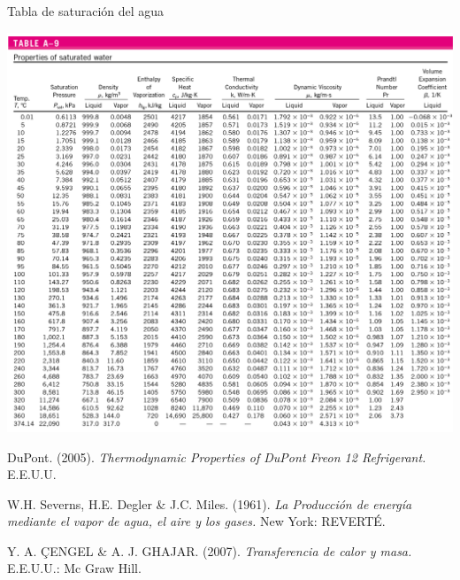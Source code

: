 \documentclass[11pt,letterpaper]{extarticle}        %
\numberwithin{equation}{section}                    %
\begin{document}
\begin{table}[H]
\centering
\caption[Tabla de saturación del agua]{Tabla de saturación del agua\cite{b:Agua}}
\label{t:Agua}
\includegraphics[width=\linewidth]{Agua}
\end{table}














\begin{thebibliography}{x}
	
		DuPont. (2005). \textit{Thermodynamic Properties of DuPont Freon 12 Refrigerant.} E.E.U.U.
	
W.H. Severns, H.E. Degler \& J.C. Miles. (1961). \textit{La Producción de energía mediante el vapor de agua, el aire y los gases.} New York: REVERTÉ.
	
	Y. A. ÇENGEL \& A. J. GHAJAR. (2007). \textit{Transferencia de calor y masa.} E.E.U.U.: Mc Graw Hill.
\end{thebibliography}
\end{document}

